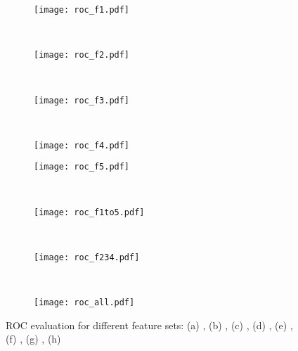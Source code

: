 \documentclass[10pt,conference,compsocconf,letterpaper]{IEEEtran}
\begin{document}
\iffeateval
\begin{figure*}[th]
        \begin{subfigure}[b]{0.24\textwidth}
                \centering
                \texttt{[image: roc\_f1.pdf]}
                \caption{}
                \label{fig:roc_f1}
        \end{subfigure}~ \begin{subfigure}[b]{0.24\textwidth}
                \centering
                \texttt{[image: roc\_f2.pdf]}
                \caption{}
                \label{fig:roc_f2}
        \end{subfigure}      
       ~ \begin{subfigure}[b]{0.24\textwidth}
                \centering
                \texttt{[image: roc\_f3.pdf]}
                \caption{}
                \label{fig:roc_f3}
        \end{subfigure} 
         ~ \begin{subfigure}[b]{0.24\textwidth}
                \centering
                \texttt{[image: roc\_f4.pdf]}
                \caption{}
                \label{fig:roc_f4}
        \end{subfigure}


        \begin{subfigure}[b]{0.24\textwidth}
                \centering
                \texttt{[image: roc\_f5.pdf]}
                \caption{}
                \label{fig:roc_f5}
        \end{subfigure}      
      		~  \begin{subfigure}[b]{0.24\textwidth}
                \centering
                \texttt{[image: roc\_f1to5.pdf]}
                \caption{}
                \label{fig:roc_f1to5}
        \end{subfigure} 	
        		~\begin{subfigure}[b]{0.24\textwidth}
                \centering
                \texttt{[image: roc\_f234.pdf]}
                \caption{}
                \label{fig:rocf234}
        \end{subfigure} 	
  		~      \begin{subfigure}[b]{0.24\textwidth}
                \centering
                \texttt{[image: roc\_all.pdf]}
                \caption{}
                \label{fig:roc_all}
        \end{subfigure} 						 

        \caption{ROC evaluation for different feature sets: (a) , (b) , (c) , (d) , (e) , (f) , (g) , (h) }\label{fig:roc}
\end{figure*}
\fi
\end{document}
